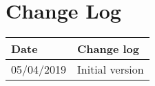\documentclass{article}
\begin{document}
\section{Change Log}
\begin{center}
 \begin{tabular}{ | p{5cm} | p{5cm} | }
  \hline
  \bf{Date} & \bf{Change log} \\
  \hline
  05/04/2019 & Initial version \\
  \hline
 \end{tabular}
\end{center}
\end{document}
